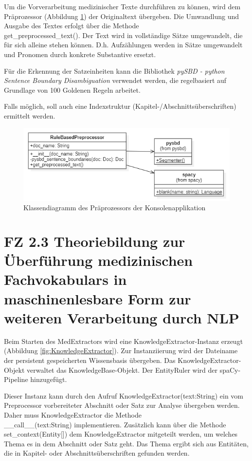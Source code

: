 Um die Vorverarbeitung medizinischer Texte durchführen zu können, wird dem Präprozessor (Abbildung \ref{fig:preprocessor}) der Originaltext übergeben. Die Umwandlung und Ausgabe des Textes erfolgt über die Methode \\
get\_preprocessed\_text(). Der Text wird in vollständige Sätze umgewandelt, die für sich alleine stehen können. D.h. Aufzählungen werden in Sätze umgewandelt und Pronomen durch konkrete Substantive ersetzt. 

Für die Erkennung der Satzeinheiten kann die Bibliothek \emph{pySBD - python Sentence Boundary Disambiguation} verwendet werden, die regelbasiert auf Grundlage von 100 \glqq Goldenen Regeln\grqq{} arbeitet.

Falls möglich, soll auch eine Indexstruktur (Kapitel-/Abschnittsüberschrif\-ten) ermittelt werden.

\begin{figure}[h]
    \centering
    \includegraphics[width=\textwidth]{pictures/RuleBasedPreprocessor.png}
    \caption{Klassendiagramm des Präprozessors der Konsolenapplikation}
    \label{fig:preprocessor}
\end{figure}

\section[FZ 2.3 Theoriebildung zur Überf. med.Fachvokabulars]{FZ 2.3 Theoriebildung zur Überführung medizinischen Fachvokabulars in maschinenlesbare Form zur weiteren Verarbeitung durch NLP}
\label{sec:FZ2.3} 

Beim Starten des MedExtractors wird eine KnowledgeExtractor-Instanz erzeugt (Abbildung \ref{fig:KnowledgeExtractor}). Zur Instanziierung wird der Dateiname der persistent gespeicherten Wissensbasis übergeben. Das KnowledgeExtractor-Objekt verwaltet das KnowledgeBase-Objekt. Der EntityRuler wird der spaCy-Pipeline hinzugefügt.

Dieser Instanz kann durch den Aufruf KnowledgeExtractor(text:String) ein vom Preprocessor vorbereiteter Abschnitt oder Satz zur Analyse übergeben werden. Daher muss KnowledgeExtractor die Methode\\
\_\_call\_\_(text:String) implementieren. Zusätzlich kann über die Methode\\
set\_context(Entity[]) dem KnowledgeExtractor mitgeteilt werden, um welches Thema es in dem Abschnitt oder Satz geht. Das Thema ergibt sich aus Entitäten, die in Kapitel- oder Abschnittsüberschriften gefunden werden.

